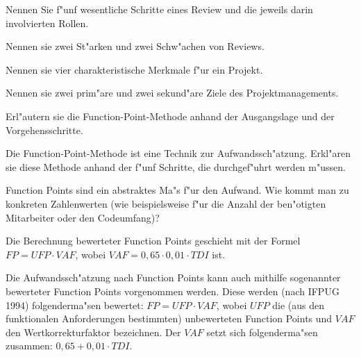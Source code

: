 \documentclass[12pt]{exam}
\begin{document}
\begin{questions}
\question[5] Nennen Sie f"unf wesentliche Schritte eines Review und die jeweils darin involvierten Rollen.
\addpoints

\question[4] Nennen sie zwei St"arken und zwei Schw"achen von Reviews.
\addpoints

\question[2] Nennen sie vier charakteristische Merkmale f"ur ein Projekt.
\addpoints

\question[4] Nennen sie zwei prim"are und zwei sekund"are Ziele des Projektmanagements.
\addpoints

\question[6] Erl"autern sie die Function-Point-Methode anhand der Ausgangslage und der Vorgehensschritte.
\addpoints

\question[5] Die Function-Point-Methode ist eine Technik zur Aufwandssch"atzung. Erkl"aren sie diese Methode anhand der f"unf Schritte, die durchgef"uhrt werden m"ussen.
\addpoints

\question[2] Function Points sind ein abstraktes Ma"s f"ur den Aufwand. Wie kommt man zu konkreten Zahlenwerten (wie beispielsweise f"ur die Anzahl der ben"otigten Mitarbeiter oder den Codeumfang)?
\addpoints

\question[6] Die Berechnung bewerteter Function Points geschieht mit der Formel $FP = UFP \cdot VAF$, wobei $VAF = 0,65 \cdot 0,01 \cdot TDI$ ist.
\noaddpoints
{}

\question[4] Die Aufwandssch"atzung nach Function Points kann auch mithilfe sogenannter bewerteter Function Points vorgenommen werden. Diese werden (nach IFPUG 1994) folgenderma"sen bewertet: $FP = UFP \cdot VAF$, wobei $UFP$ die (aus den funktionalen Anforderungen bestimmten) unbewerteten Function Points und $VAF$ den Wertkorrekturfaktor bezeichnen. Der $VAF$ setzt sich folgenderma"sen zusammen: $0,65 + 0,01 \cdot TDI$.
\end{questions}
\end{document}
